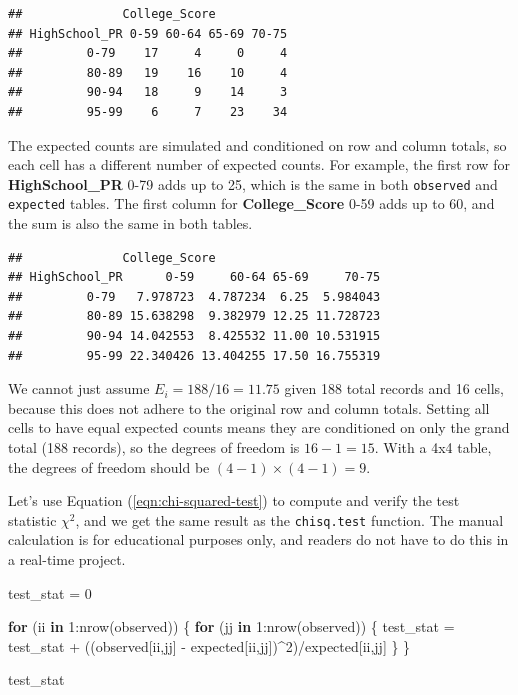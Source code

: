\documentclass[
]{article}
\newenvironment{Shaded}{\begin{snugshade}}{\end{snugshade}}
\newcommand{\ControlFlowTok}[1]{\textcolor[rgb]{0.13,0.29,0.53}{\textbf{#1}}}
\newcommand{\DecValTok}[1]{\textcolor[rgb]{0.00,0.00,0.81}{#1}}
\newcommand{\FunctionTok}[1]{\textcolor[rgb]{0.00,0.00,0.00}{#1}}
\newcommand{\NormalTok}[1]{#1}
\newcommand{\OtherTok}[1]{\textcolor[rgb]{0.56,0.35,0.01}{#1}}
\newcommand{\SpecialCharTok}[1]{\textcolor[rgb]{0.00,0.00,0.00}{#1}}
\begin{document}
\begin{verbatim}
##              College_Score
## HighSchool_PR 0-59 60-64 65-69 70-75
##         0-79    17     4     0     4
##         80-89   19    16    10     4
##         90-94   18     9    14     3
##         95-99    6     7    23    34
\end{verbatim}

The expected counts are simulated and conditioned on row and column
totals, so each cell has a different number of expected counts. For
example, the first row for \textbf{HighSchool\_PR} 0-79 adds up to 25,
which is the same in both \texttt{observed} and \texttt{expected}
tables. The first column for \textbf{College\_Score} 0-59 adds up to 60,
and the sum is also the same in both tables.

\begin{Shaded}
\end{Shaded}

\begin{verbatim}
##              College_Score
## HighSchool_PR      0-59     60-64 65-69     70-75
##         0-79   7.978723  4.787234  6.25  5.984043
##         80-89 15.638298  9.382979 12.25 11.728723
##         90-94 14.042553  8.425532 11.00 10.531915
##         95-99 22.340426 13.404255 17.50 16.755319
\end{verbatim}

We cannot just assume \(E_i = 188/16 = 11.75\) given 188 total records
and 16 cells, because this does not adhere to the original row and
column totals. Setting all cells to have equal expected counts means
they are conditioned on only the grand total (188 records), so the
degrees of freedom is \(16-1=15\). With a 4x4 table, the degrees of
freedom should be \((4-1)\times(4-1)=9\).

Let's use Equation (\ref{eqn:chi-squared-test}) to compute and verify
the test statistic \(\chi^2\), and we get the same result as the
\texttt{chisq.test} function. The manual calculation is for educational
purposes only, and readers do not have to do this in a real-time
project.

\begin{Shaded}
\begin{Highlighting}[]
\NormalTok{test\_stat }\OtherTok{=} \DecValTok{0}

\ControlFlowTok{for}\NormalTok{ (ii }\ControlFlowTok{in} \DecValTok{1}\SpecialCharTok{:}\FunctionTok{nrow}\NormalTok{(observed)) \{}
  \ControlFlowTok{for}\NormalTok{ (jj }\ControlFlowTok{in} \DecValTok{1}\SpecialCharTok{:}\FunctionTok{nrow}\NormalTok{(observed)) \{}
\NormalTok{    test\_stat }\OtherTok{=}\NormalTok{ test\_stat }\SpecialCharTok{+}\NormalTok{ ((observed[ii,jj] }\SpecialCharTok{{-}}\NormalTok{ expected[ii,jj])}\SpecialCharTok{\^{}}\DecValTok{2}\NormalTok{)}\SpecialCharTok{/}\NormalTok{expected[ii,jj]}
\NormalTok{  \}}
\NormalTok{\}}

\NormalTok{test\_stat}
\end{Highlighting}
\end{Shaded}
\end{document}

